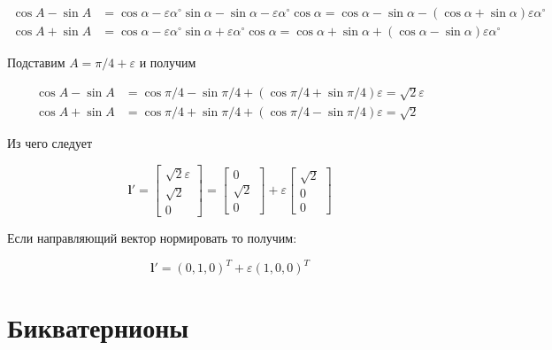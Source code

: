   \begin{align*}
      \cos A - \sin A & =\cos \alpha - \varepsilon \alpha^\circ \sin \alpha - \sin \alpha - \varepsilon \alpha^\circ \cos \alpha =
    \cos \alpha - \sin \alpha - (\cos \alpha + \sin \alpha)\varepsilon \alpha^\circ \\
    \cos A + \sin A & = \cos \alpha - \varepsilon \alpha^\circ \sin \alpha + \varepsilon \alpha^\circ \cos \alpha =
    \cos \alpha + \sin \alpha + (\cos \alpha - \sin \alpha)\varepsilon \alpha^\circ
  \end{align*}

  Подставим $A=\pi/4+\varepsilon$ и получим

  \begin{align*}
    \cos A - \sin A & = \cos \pi/4 - \sin \pi/4 + (\cos \pi/4 + \sin \pi/4)\varepsilon = \sqrt{2} \varepsilon \\
    \cos A + \sin A & = \cos \pi/4 + \sin \pi/4 + (\cos \pi/4 - \sin \pi/4)\varepsilon = \sqrt{2}
  \end{align*}

  Из чего следует

  \begin{equation*}
    \mathbf{l}'=
    \begin{bmatrix}
      \sqrt{2} \varepsilon \\
      \sqrt{2} \\
      0
    \end{bmatrix}
    =
    \begin{bmatrix}
      0 \\
      \sqrt{2} \\
      0
    \end{bmatrix}
    + \varepsilon
    \begin{bmatrix}
      \sqrt{2} \\
      0 \\
      0
    \end{bmatrix}
  \end{equation*}

  Если направляющий вектор нормировать то получим:

  \begin{equation*}
    \mathbf{l}' = (0,1,0)^T + \varepsilon (1,0,0)^T
  \end{equation*}

  \section{Бикватернионы}

